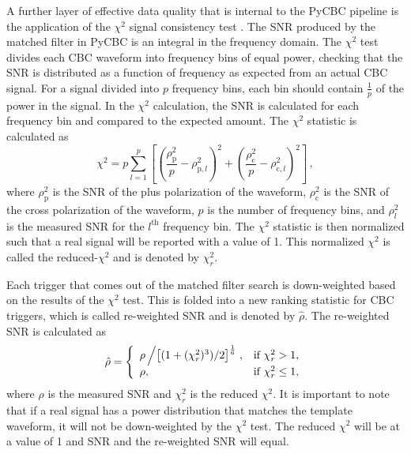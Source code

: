 A further layer of effective data quality that is internal to the PyCBC pipeline is the application of the
$\chi^{2}$ signal consistency test \cite{Allen:2004gu}. The SNR produced by the matched filter in PyCBC is an
integral in the frequency domain. The $\chi^{2}$ test divides each CBC waveform into
frequency bins of equal power, checking that the SNR is distributed as a function of frequency
as expected from an actual CBC signal.
For a signal divided into $p$ frequency bins, each bin should contain $\frac{1}{p}$ of the power in the 
signal. 
In the $\chi^2$ calculation, the SNR is calculated for each frequency bin and compared to the expected 
amount. The $\chi^2$ statistic is calculated as \cite{Usman:2015kfa}
\begin{equation}
\chi^2 = p\displaystyle\sum_{l=1}^{p}\left[\left(\frac{\rho_\mathrm{p}^2}{p}-\rho_{\mathrm{p},l}^2\right)^2 + \left(\frac{\rho^2_\mathrm{c}}{p}-\rho_{\mathrm{c},l}^2\right)^2 \right] \, ,
\label{eq:chisqr}
\end{equation}
where $\rho^2_\mathrm{p}$ is the SNR of the plus polarization of the waveform, $\rho^2_\mathrm{c}$ 
is the SNR of the cross 
polarization of the waveform, $p$ is the number of frequency bins, and $\rho^2_l$ is the measured SNR 
for the $l^\mathrm{th}$ frequency bin.
The $\chi^2$ statistic is then normalized such that a real signal will be reported with a value of 1. 
This normalized $\chi^2$ is called the reduced-$\chi^2$ and is denoted by $\chi^2_r$.

Each trigger that comes out of the matched filter search is down-weighted based on the results of
the $\chi^{2}$ test. This is folded into a new ranking statistic for CBC triggers,
which is called re-weighted SNR and is denoted by $\hat{\rho}$.
The re-weighted SNR is calculated as \cite{Usman:2015kfa} 
\begin{equation}
\hat{\rho} = \left\{\begin{array}{lr}
\rho\left/\left[(1+(\chi^2_r)^3)/2\right]^\frac{1}{6}\right., & \text{if } \chi_r^2 > 1, \\
\rho, & \text{if } \chi_r^2 \le 1,
\label{eq:reweighted}
\end{array}\right.
\end{equation}
where $\rho$ is the measured SNR and $\chi^2_r$ is the reduced $\chi^2$.
It is important to note that if a real signal has a power
distribution that matches the template waveform, it will not be
down-weighted by the $\chi^{2}$ test. The reduced $\chi^2$ will be at a value of 1 
and SNR and the re-weighted SNR will equal.

